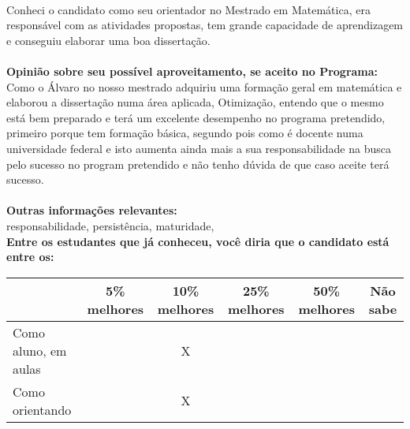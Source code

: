 \documentclass[11pt]{article}
\begin{document}
\\Conheci o candidato como seu orientador no Mestrado em Matemática, era responsável com as atividades propostas, tem grande capacidade de aprendizagem e conseguiu elaborar uma boa dissertação.\\
\\
\textbf{Opinião sobre seu possível aproveitamento, se aceito no Programa:}
\\Como o Álvaro no nosso mestrado adquiriu uma formação geral em matemática e elaborou a dissertação numa área aplicada, Otimização,  entendo que o mesmo está bem preparado e terá um excelente desempenho no programa pretendido, primeiro porque tem formação básica, segundo pois como é docente numa universidade federal e isto aumenta ainda mais a sua responsabilidade na busca pelo sucesso no program pretendido e não tenho dúvida de que caso aceite terá sucesso.\\ 
\\
\textbf{Outras informações relevantes:} \\responsabilidade, persistência, maturidade,
\\[0.3cm]
\textbf{Entre os estudantes que já conheceu, você diria que o candidato está entre os:}
\\
\begin{tabular}{|l|c|c|c|c|c|}
\hline
 & 5\% melhores & 10\% melhores & 25\% melhores & 50\% melhores & Não sabe \\
\hline
Como aluno, em aulas &  & X &  &  & \\
\hline
Como orientando &  & X &  &  & \\
\hline
\end{tabular}
\end{document}
